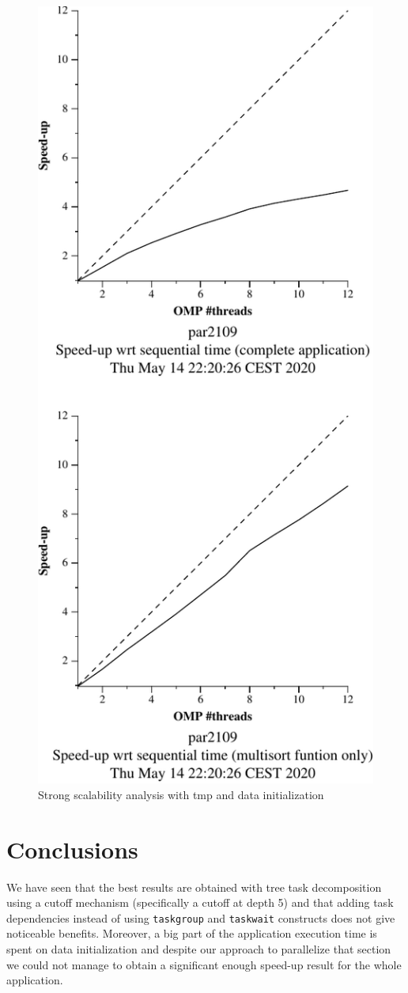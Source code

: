 \begin{figure}[H]
        \centering
        \includegraphics[width=0.35\linewidth]{plots/new-omp-tree-depen-opt-crop.pdf}
        \caption{Strong scalability analysis with tmp and data initialization}
        \label{fig:ssa_opt} 
\end{figure}


\section{Conclusions}%
\label{sec:conclusions}

We have seen that the best results are obtained with tree task decomposition using a cutoff mechanism
(specifically a cutoff at depth 5) and that adding task dependencies instead of using \texttt{taskgroup} and
\texttt{taskwait} constructs does not give noticeable benefits. Moreover, a big part of the application execution
time is spent on data initialization and despite our approach to parallelize that section we could not manage to
obtain a significant enough speed-up result for the whole application.




